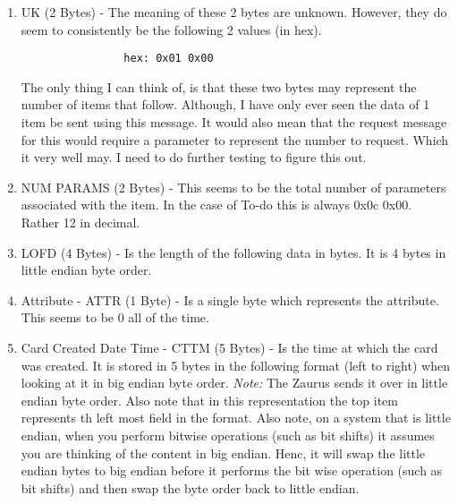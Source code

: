             \begin{enumerate}

              \item UK (2 Bytes) - The meaning of these 2 bytes are unknown.
              However, they do seem to consistently be the following 2 values
              (in hex).

              \begin{verbatim}
                hex: 0x01 0x00
              \end{verbatim}

              The only thing I can think of, is that these two bytes may
              represent the number of items that follow. Although, I have only
              ever seen the data of 1 item be sent using this message. It
              would also mean that the request message for this would require
              a parameter to represent the number to request. Which it very
              well may. I need to do further testing to figure this out.

              \item NUM PARAMS (2 Bytes) - This seems to be the total number
              of parameters associated with the item. In the case of To-do this
              is always 0x0c 0x00. Rather 12 in decimal.

              \item LOFD (4 Bytes) - Is the length of the following data in
              bytes. It is 4 bytes in little endian byte order.

              \item Attribute - ATTR (1 Byte) - Is a single byte which
              represents the attribute. This seems to be 0 all of the time.

              \item Card Created Date Time - CTTM (5 Bytes) - Is the time at
              which the card was created. It is stored in 5 bytes in the
              following format (left to right) when looking at it in big
              endian byte order. \emph{Note:} The Zaurus sends it over in
              little endian byte order. Also note that in this representation
              the top item represents th left most field in the format. Also
              note, on a system that is little endian, when you perform
              bitwise operations (such as bit shifts) it assumes you are
              thinking of the content in big endian. Henc, it will swap the
              little endian bytes to big endian before it performs the bit
              wise operation (such as bit shifts) and then swap the byte order
              back to little endian.


\end{enumerate}
